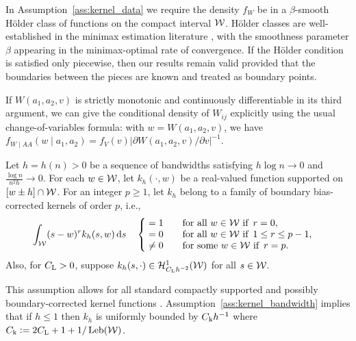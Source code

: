 In Assumption~\ref{ass:kernel_data} we require
the density $f_W$ be in a $\beta$-smooth H\"older class of
functions on the compact interval $\mathcal{W}$.
H\"older classes are well-established in the minimax estimation literature
\citep{gine2021mathematical}, with the smoothness parameter $\beta$ appearing
in the minimax-optimal rate of convergence.
If the H\"older condition is satisfied only piecewise,
then our results remain valid provided that the boundaries
between the pieces are known and treated as boundary points.

If $W(a_1, a_2, v)$ is strictly monotonic and continuously differentiable in
its third argument,
we can give the conditional density of $W_{i j}$ explicitly
using the usual change-of-variables formula: with $w=W(a_1,a_2,v)$,
we have
$f_{W \mid AA}(w \mid a_1,a_2) = f_V(v)
\big|\partial W(a_1,a_2,v)/\partial v\big|^{-1}$.

\begin{assumption}\label{ass:kernel_bandwidth}%
  \onehalfspacing

  Let $h = h(n) > 0$
  be a sequence of bandwidths
  satisfying $h \log n \to 0$
  and $\frac{\log n}{n^2h} \to 0$.
  For each $w \in \mathcal{W}$, let $k_h(\cdot, w)$
  be a real-valued function supported on
  $[w \pm h] \cap \mathcal{W}$.
  For an integer $p \geq 1$,
  let $k_h$ belong to a family of
  boundary bias-corrected kernels of order $p$, i.e.,
  \begin{align*}
    \int_{\mathcal{W}}
    (s-w)^r k_h(s,w) \,\mathrm{d}s
    \quad
    \begin{cases}
      \begin{alignedat}{2}
        &= 1 &\qquad &\text{for all } w \in \mathcal{W} \text{ if }\, r = 0, \\
        &= 0 & &\text{for all } w \in \mathcal{W} \text{ if }\, 1 \leq r \leq p-1, \\
        &\neq 0 & &\text{for some } w \in \mathcal{W} \text{ if }\, r = p.
      \end{alignedat}
    \end{cases}
  \end{align*}
  Also, for $C_{\mathrm{L}} > 0$,
  suppose $k_h(s, \cdot) \in \mathcal{H}^1_{C_{\mathrm{L}} h^{-2}}(\mathcal{W})$
  for all $s \in \mathcal{W}$.
\end{assumption}

This assumption allows for all standard compactly supported
and possibly boundary-corrected kernel functions
\citep{wand1994kernel,simonoff2012smoothing}.
Assumption~\ref{ass:kernel_bandwidth} implies that
if $h \leq 1$ then
$k_h$ is uniformly bounded by
$C_{\mathrm{k}} h^{-1}$ where $C_{\mathrm{k}} \vcentcolon = 2 C_{\mathrm{L}} + 1 + 1/\operatorname{Leb}(\mathcal{W})$.

